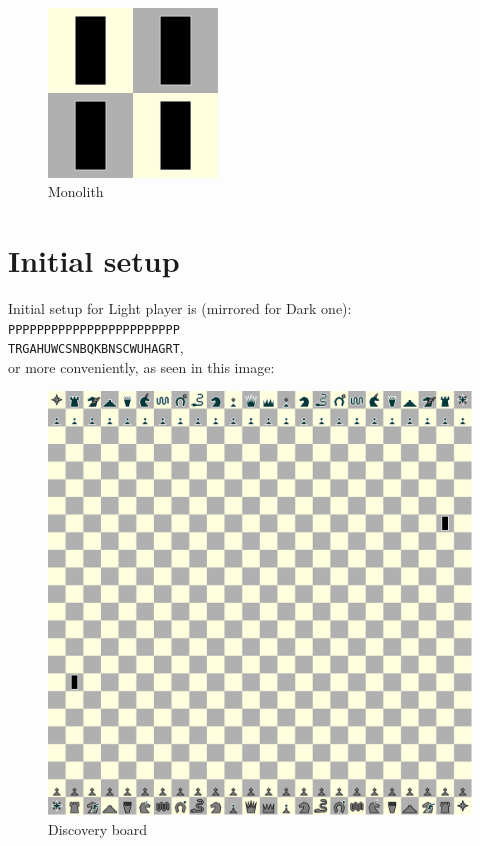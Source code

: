 \documentclass[a5paper,12pt,draft]{book} %
\begin{document}
\noindent
\begin{figure}
\includegraphics[width=0.4\textwidth, keepaspectratio=true]{../gfx/pieces/15_monolith.png}
\caption{Monolith}
\label{fig:monolith}
\end{figure}

\clearpage

\section*{Initial setup}

Initial setup for Light player is (mirrored for Dark one):
\texttt{PPPPPPPPPPPPPPPPPPPPPPPP \\
        TRGAHUWCSNBQKBNSCWUHAGRT}, \\
or more conveniently, as seen in this image:

\noindent
\begin{figure}[h]
\includegraphics[width=1.0\textwidth, keepaspectratio=true]{../gfx/boards/20_discovery.png}
\caption{Discovery board}
\label{fig:discovery}
\end{figure}
\end{document}
